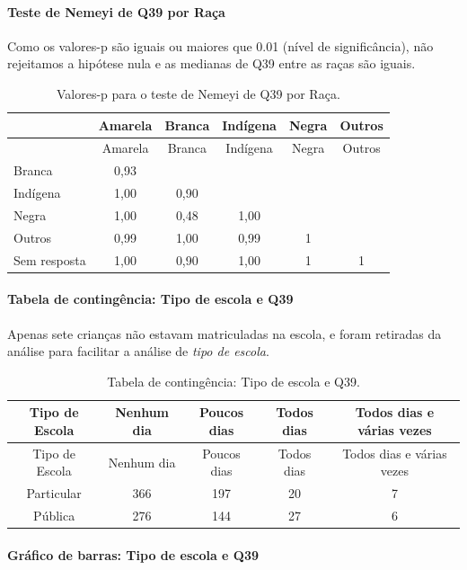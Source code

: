 \documentclass[]{article}
\let\oldparagraph\paragraph
\renewcommand{\paragraph}[1]{\oldparagraph{#1}\mbox{}}
\begin{document}
\hypertarget{teste-de-nemeyi-de-q39-por-rauxe7a}{%
\paragraph{Teste de Nemeyi de Q39 por Raça}\label{teste-de-nemeyi-de-q39-por-rauxe7a}}

Como os valores-p são iguais ou maiores que 0.01 (nível de significância), não rejeitamos a hipótese nula e as medianas de Q39 entre as raças são iguais.

\begin{longtable}[]{@{}lccccc@{}}
\caption{\label{tab:unnamed-chunk-1526}Valores-p para o teste de Nemeyi de Q39 por Raça.}\tabularnewline
\toprule
& Amarela & Branca & Indígena & Negra & Outros\tabularnewline
\midrule
\endfirsthead
\toprule
& Amarela & Branca & Indígena & Negra & Outros\tabularnewline
\midrule
\endhead
Branca & 0,93 & & & &\tabularnewline
Indígena & 1,00 & 0,90 & & &\tabularnewline
Negra & 1,00 & 0,48 & 1,00 & &\tabularnewline
Outros & 0,99 & 1,00 & 0,99 & 1 &\tabularnewline
Sem resposta & 1,00 & 0,90 & 1,00 & 1 & 1\tabularnewline
\bottomrule
\end{longtable}

\cleardoublepage

\hypertarget{tabela-de-continguxeancia-tipo-de-escola-e-q39}{%
\paragraph{Tabela de contingência: Tipo de escola e Q39}\label{tabela-de-continguxeancia-tipo-de-escola-e-q39}}

Apenas sete crianças não estavam matriculadas na escola, e foram retiradas da análise para facilitar a análise de \emph{tipo de escola}.

\begin{longtable}[]{@{}ccccc@{}}
\caption{\label{tab:unnamed-chunk-1527}Tabela de contingência: Tipo de escola e Q39.}\tabularnewline
\toprule
Tipo de Escola & Nenhum dia & Poucos dias & Todos dias & Todos dias e várias vezes\tabularnewline
\midrule
\endfirsthead
\toprule
Tipo de Escola & Nenhum dia & Poucos dias & Todos dias & Todos dias e várias vezes\tabularnewline
\midrule
\endhead
Particular & 366 & 197 & 20 & 7\tabularnewline
Pública & 276 & 144 & 27 & 6\tabularnewline
\bottomrule
\end{longtable}

\hypertarget{gruxe1fico-de-barras-tipo-de-escola-e-q39}{%
\paragraph{Gráfico de barras: Tipo de escola e Q39}\label{gruxe1fico-de-barras-tipo-de-escola-e-q39}}
\end{document}
